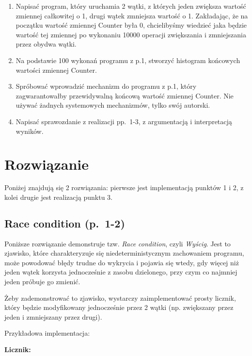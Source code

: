\documentclass[11pt]{article}
\begin{document}
\begin{enumerate}
\def\labelenumi{\arabic{enumi}.}
\item
  Napisać program, który uruchamia 2 wątki, z których jeden zwiększa
  wartość zmiennej całkowitej o 1, drugi wątek zmniejsza wartość o 1.
  Zakładając, że na początku wartość zmiennej Counter była 0,
  chcielibyśmy wiedzieć jaka będzie wartość tej zmiennej po wykonaniu
  10000 operacji zwiększania i zmniejszania przez obydwa wątki.
\item
  Na podstawie 100 wykonań programu z p.1, stworzyć histogram końcowych
  wartości zmiennej Counter.
\item
  Spróbować wprowadzić mechanizm do programu z p.1, który
  zagwarantowałby przewidywalną końcową wartość zmiennej Counter. Nie
  używać żadnych systemowych mechanizmów, tylko swój autorski.
\item
  Napisać sprawozdanie z realizacji pp.~1-3, z argumentacją i
  interpretacją wyników.
\end{enumerate}

\hypertarget{rozwiux105zanie}{%
\section{Rozwiązanie}\label{rozwiux105zanie}}

Poniżej znajdują się 2 rozwiązania: pierwsze jest implementacją punktów
1 i 2, z kolei drugie jest realizacją punktu 3.

\hypertarget{race-condition-p.-1-2}{%
\subsection{Race condition (p.~1-2)}\label{race-condition-p.-1-2}}

Poniższe rozwiązanie demonstruje tzw. \emph{Race condition}, czyli
\emph{Wyścig}. Jest to zjawisko, które charakteryzuje się
niedeterministycznym zachowaniem programu, może powodować błędy trudne
do wykrycia i pojawia się wtedy, gdy więcej niż jeden wątek korzysta
jednocześnie z zasobu dzielonego, przy czym co najmniej jeden próbuje go
zmienić.

Żeby zademonstrować to zjawisko, wystarczy zaimplementować prosty
licznik, który będzie modyfikowany jednocześnie przez 2 wątki (np.
zwiększany przez jeden i zmniejszany przez drugi).

Przykładowa implementacja:

\textbf{Licznik:}
\end{document}

